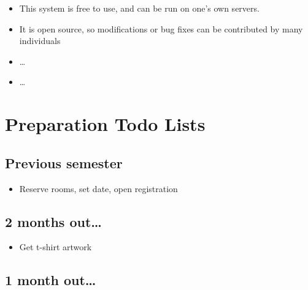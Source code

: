 \documentclass[11pt,twoside,letterpaper]{book}
\providecommand{\tightlist}{%
  \setlength{\itemsep}{0pt}\setlength{\parskip}{0pt}}
\newenvironment{itemlist}{
\begin{itemize}
\setlength{\itemsep}{0pt}
\setlength{\parskip}{0pt}}
{\end{itemize}}
\begin{document}

\begin{itemize}
  \tightlist
\item This system is free to use, and can be run on one's own servers.
\item It is open source, so modifications or bug fixes can be
  contributed by many individuals
\end{itemize}


\begin{itemize}
  \tightlist
\item \ldots
\end{itemize}


\begin{itemize}
  \tightlist
\item \ldots
\end{itemize}




\chapter{Preparation Todo Lists}

\section{Previous semester}

\begin{itemlist}
\item Reserve rooms, set date, open registration
\end{itemlist}


\section{2 months out\ldots}

\begin{itemlist}
\item Get t-shirt artwork
\end{itemlist}


\section{1 month out\ldots}
\end{document}
